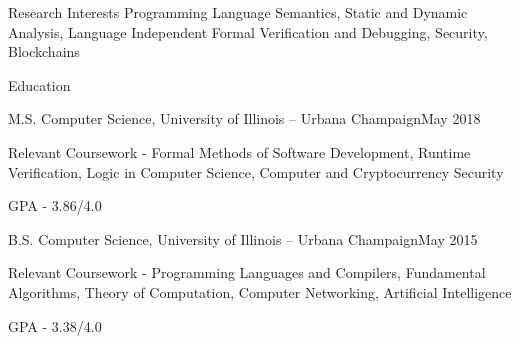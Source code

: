 \documentclass{resume} %
\begin{document}
 
 \begin{rSection}{Research Interests}
  Programming Language Semantics, Static and Dynamic Analysis, Language Independent Formal Verification and Debugging, Security, Blockchains
 \end{rSection}
\begin{rSection}{Education}
\begin{rSubsection}{ M.S. Computer Science, University of Illinois -- Urbana Champaign}{May 2018}{}{}
\item Relevant Coursework - Formal Methods of Software Development, Runtime Verification, Logic in Computer Science, Computer and Cryptocurrency Security
\item GPA - 3.86/4.0
\end{rSubsection}
\begin{rSubsection}{ B.S. Computer Science, University of Illinois -- Urbana Champaign}{May 2015}{}{}
\item Relevant Coursework - Programming Languages and Compilers, Fundamental Algorithms, Theory of Computation, Computer Networking, Artificial Intelligence
\item GPA - 3.38/4.0
\end{rSubsection}
\end{rSection}
\end{document}
